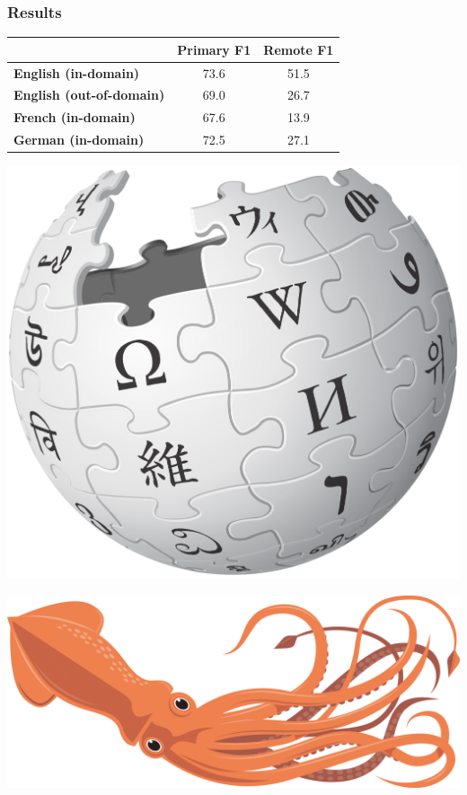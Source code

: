 \documentclass[t,xcolor={svgnames}]{beamer}
\begin{document}
\begin{frame}
\frametitle{Results}
\centering
\small
\setlength\tabcolsep{3pt}
\begin{tabular}{lcc}
& \footnotesize \bf Primary F1 & \footnotesize \bf Remote F1 \\
\hline
\small \bf English (in-domain)     & 73.6 & 51.5 \\
\small \bf English (out-of-domain) & 69.0 & 26.7 \\
\small \bf French (in-domain)      & 67.6 & 13.9 \\
\small \bf German (in-domain)      & 72.5 & 27.1
\end{tabular}
\vfill

\begin{center}
  \begin{minipage}{.3\textwidth}\includegraphics[width=\textwidth]{wikipedia.png}\end{minipage}
  \begin{minipage}{.3\textwidth}\includegraphics[width=\textwidth]{squid.jpg}\end{minipage}
\end{center}
\end{frame}
\end{document}

